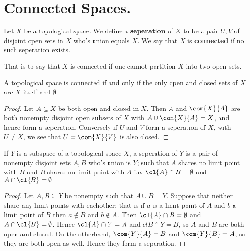 
\section{Connected Spaces.}

\begin{definition}
    Let $X$ be a topological space. We define a  \textbf{seperation} of $X$ to be a pair $U,V$ of disjoint
    open sets in  $X$ who's union equals  $X$. We say that $X$ is \textbf{connected} if no such
    seperation exists.
\end{definition}

That is to say that $X$ is connected if one cannot partition  $X$ into two open sets.

\begin{lemma}\label{3.1.1}
    A topological space is connected if and only if the only open and closed sets of $X$ are  $X$
    itself and $\emptyset$.
\end{lemma}
\begin{proof}
Let $A \subseteq X$ be both open and closed in $X$. Then $A$ and $\com{X}{A}$ are both nonempty
disjoint open subsets of $X$ with $A \cup \com{X}{A}=X$, and hence form a seperation. Conversely if
$U$ and  $V$ form a seperation of  $X$, with  $U \neq X$, we see that  $U=\com{X}{V}$ is also
closed.
\end{proof}

\begin{lemma}\label{3.1.2}
    If $Y$ is a subspace of a topological space  $X$, a seperation of  $Y$ is a pair of nonempty
    disjoint sets  $A,B$ who's union is $Y$; such that  $A$ shares no limit point with  $B$ and  $B$
    shares no limit point with  $A$ i.e.  $\cl{A} \cap B = \emptyset$ and $A \cap \cl{B}=\emptyset$
\end{lemma}
\begin{proof}
    Let $A,B \subseteq Y$ be nonempty such that  $A \cup B=Y$. Suppose that neither share any
    limit points with eachother; that is if $a$ is a limit point of $A$ and  $b$ a limit point of
    $B$ then  $a \notin B$ and  $b \notin A$. Then  $\cl{A} \cap B=\emptyset$ and $A \cap
    \cl{B}=\emptyset$. Hence $\cl{A} \cap Y=A$ and $cl{B} \cap Y=B$, so $A$ and  $B$ are both open
    and closed. On the otherhand,  $\com{Y}{A}=B$ and $\com{Y}{B}=A$, so they are both open as well.
    Hence they form a seperation.
\end{proof}

